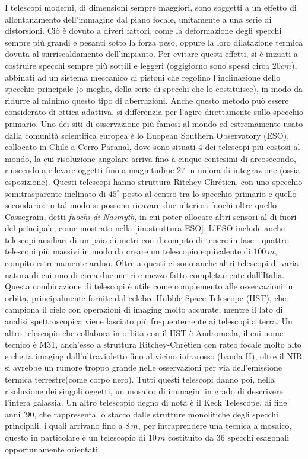 I telescopi moderni, di dimensioni sempre maggiori, sono soggetti a un effetto di allontanamento dell'immagine dal piano focale, unitamente a una serie di distorsioni. Ciò è dovuto a diveri fattori, come la deformazione degli specchi sempre più grandi e pesanti sotto la forza peso, oppure la loro dilatazione termica dovuta al surriscaldamento dell'impianto. Per evitare questi effetti, si è iniziati a costruire specchi sempre più sottili e leggeri (oggigiorno sono spessi circa $20cm$), abbinati ad un sistema meccanico di pistoni che regolino l'inclinazione dello specchio principale (o meglio, della serie di specchi che lo costituisce), in modo da ridurre al minimo questo tipo di aberrazioni. Anche questo metodo può essere considerato di ottica adattiva, si differenzia per l'agire direttamente sullo specchio primario. Uno dei siti di osservazione più famosi al mondo ed estremamente usato dalla comunità scientifica europea è lo Euopean Southern Observatory (ESO), collocato in Chile a Cerro Paranal, dove sono situati 4 dei telescopi più costosi al mondo, la cui risoluzione angolare arriva fino a cinque centesimi di arcosecondo, riuscendo a rilevare oggetti fino a magnitudine $27$ in un'ora di integrazione (ossia esposizione). Questi telescopi hanno struttura Ritchey-Chrétien, con uno specchio semitrasparente inclinato di $45^{\circ}$ posto al centro tra lo specchio primario e quello secondario: in tal modo si possono ricavare due ulteriori fuochi oltre quello Cassegrain, detti \textit{fuochi di Nasmyth}, in cui poter allocare altri sensori al di fuori del principale, come mostrato nella \ref{im:struttura-ESO}. L'ESO include anche telescopi ausiliari di un paio di metri con il compito di tenere in fase i quattro telescopi più massivi in modo da creare un telescopio equivalente di $100\, m$, compito estremamente arduo. Oltre a questi ci sono anche altri telescopi di varia natura di cui uno di circa due metri e mezzo fatto completamente dall'Italia. Questa combinazione di telescopi è utile come complemento alle osservazioni in orbita, principalmente fornite dal celebre Hubble Space Telescope (HST), che campiona il cielo con operazioni di imaging molto accurate, mentre il lato di analisi spettroscopica viene lasciato più frequentemente ai telescopi a terra. Un altro telescopio che collabora in orbita con il HST è Andromeda, il cui nome tecnico è M31, anch'esso a struttura Ritchey-Chrétien con rateo focale molto alto e che fa imaging dall'ultravioletto fino al vicino infrarosso (banda H), oltre il NIR si avrebbe un rumore troppo grande nelle osservazioni per via dell'emissione termica terrestre(come corpo nero). Tutti questi telescopi danno poi, nella risoluzione dei singoli oggetti, un mosaico di immagini in grado di descrivere l'intera galassia. Un altro telescopio degno di nota è il Keck Telescope, di fine anni $'90$, che rappresenta lo stacco dalle strutture monolitiche degli specchi principali, i quali arrivano fino a $8\, m$, per intraprendere una tecnica a mosaico, questo in particolare è un telescopio di $10\, m$ costituito da $36$ specchi esagonali opportunamente orientati.

